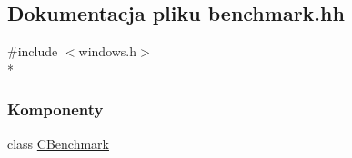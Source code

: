 \hypertarget{benchmark_8hh}{}\subsection{Dokumentacja pliku benchmark.\+hh}
\label{benchmark_8hh}
{\ttfamily \#include $<$windows.\+h$>$}\\*
\subsubsection*{Komponenty}
\begin{DoxyCompactItemize}
\item 
class \hyperlink{class_c_benchmark}{C\+Benchmark}
\end{DoxyCompactItemize}
